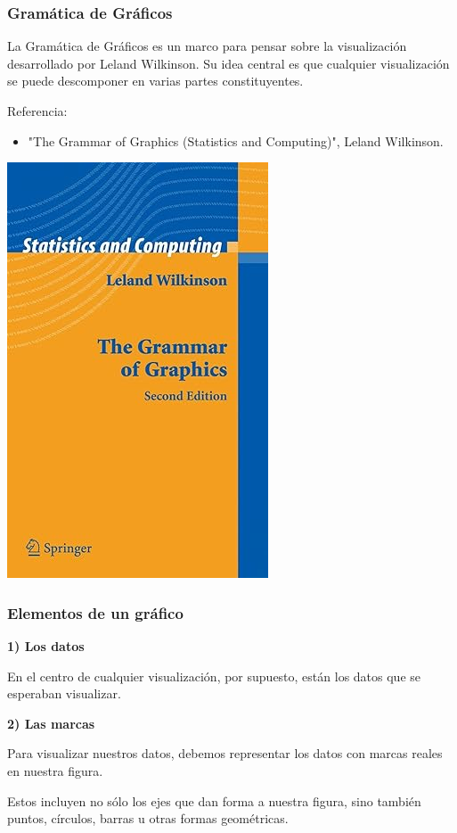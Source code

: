 \documentclass[aspectratio=169,12pt]{beamer}
\begin{document}
\begin{frame}
\frametitle{Gramática de Gráficos}

\begin{minipage}{.55\textwidth}
La Gramática de Gráficos es un marco para pensar sobre la visualización desarrollado por Leland Wilkinson. Su idea central es que cualquier visualización se puede descomponer en varias partes constituyentes.

\vspace{0.5cm}

Referencia:
\begin{itemize}
\item "The Grammar of Graphics (Statistics and Computing)", Leland Wilkinson.
\end{itemize}
\end{minipage} %
\begin{minipage}{.4\textwidth}
\begin{center}
\includegraphics[scale=0.35]{TheGrammarOfGraphics.jpg}
\end{center}
\end{minipage}

\end{frame}


\begin{frame}
\frametitle{Elementos de un gráfico}

\textbf{1) Los datos}

En el centro de cualquier visualización, por supuesto, están los datos que se esperaban visualizar.

\textbf{2) Las marcas}

Para visualizar nuestros datos, debemos representar los datos con marcas reales en nuestra figura.

Estos incluyen no sólo los ejes que dan forma a nuestra figura, sino también puntos, círculos, barras u otras formas geométricas.

\end{frame}
\end{document}
